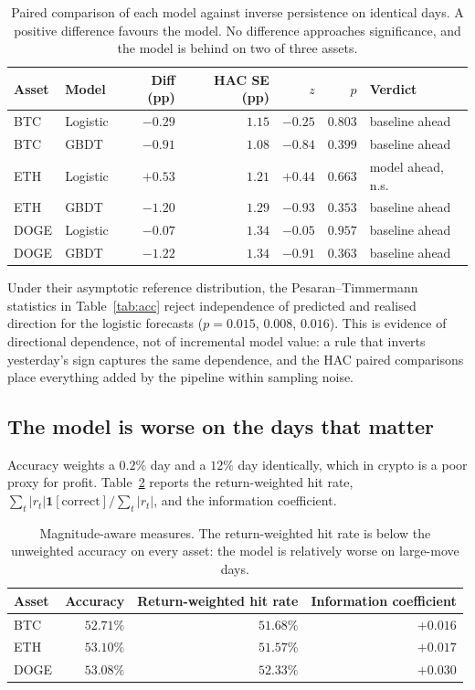 \documentclass[preprint,12pt,authoryear]{elsarticle}
\begin{document}
\begin{table}[t]\centering\small
\caption{Paired comparison of each model against inverse persistence on identical
days. A positive difference favours the model. No difference approaches
significance, and the model is behind on two of three assets.}
\label{tab:paired}
\begin{tabular}{@{}llrrrrl@{}}
\toprule
Asset & Model & Diff (pp) & HAC SE (pp) & $z$ & $p$ & Verdict \\
\midrule
BTC  & Logistic & $-0.29$ & $1.15$ & $-0.25$ & $0.803$ & baseline ahead \\
BTC  & GBDT     & $-0.91$ & $1.08$ & $-0.84$ & $0.399$ & baseline ahead \\
ETH  & Logistic & $+0.53$ & $1.21$ & $+0.44$ & $0.663$ & model ahead, n.s. \\
ETH  & GBDT     & $-1.20$ & $1.29$ & $-0.93$ & $0.353$ & baseline ahead \\
DOGE & Logistic & $-0.07$ & $1.34$ & $-0.05$ & $0.957$ & baseline ahead \\
DOGE & GBDT     & $-1.22$ & $1.34$ & $-0.91$ & $0.363$ & baseline ahead \\
\bottomrule
\end{tabular}
\end{table}

Under their asymptotic reference distribution, the Pesaran--Timmermann
statistics in Table~\ref{tab:acc} reject independence of predicted and realised
direction for the logistic forecasts ($p = 0.015$, $0.008$, $0.016$). This is
evidence of directional dependence, not of incremental model value: a rule that
inverts yesterday's sign captures the same dependence, and the HAC paired
comparisons place everything added by the pipeline within sampling noise.

\subsection{The model is worse on the days that matter}

Accuracy weights a $0.2\%$ day and a $12\%$ day identically, which in crypto is a
poor proxy for profit. Table~\ref{tab:weighted} reports the return-weighted hit
rate, $\sum_t |r_t| \mathbf{1}[\text{correct}] / \sum_t |r_t|$, and the
information coefficient.

\begin{table}[t]\centering\small
\caption{Magnitude-aware measures. The return-weighted hit rate is below the
unweighted accuracy on every asset: the model is relatively worse on large-move
days.}
\label{tab:weighted}
\begin{tabular}{@{}lrrr@{}}
\toprule
Asset & Accuracy & Return-weighted hit rate & Information coefficient \\
\midrule
BTC  & $52.71\%$ & $51.68\%$ & $+0.016$ \\
ETH  & $53.10\%$ & $51.57\%$ & $+0.017$ \\
DOGE & $53.08\%$ & $52.33\%$ & $+0.030$ \\
\bottomrule
\end{tabular}
\end{table}
\end{document}
